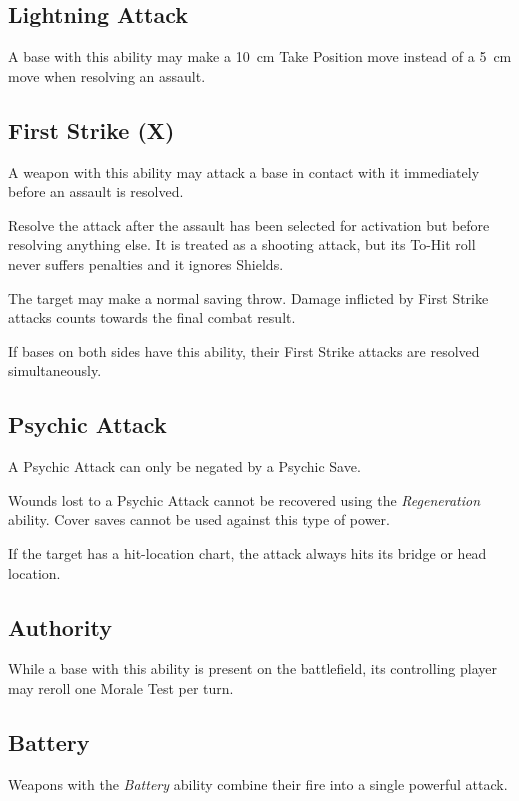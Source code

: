 \subsection{Lightning Attack}

A base with this ability may make a 10~cm Take Position move instead of a 5~cm move when resolving an assault.

\subsection{First Strike (X)}

A weapon with this ability may attack a base in contact with it immediately before an assault is resolved.

Resolve the attack after the assault has been selected for activation but before resolving anything else. It is treated as a shooting attack, but its To-Hit roll never suffers penalties and it ignores Shields.

The target may make a normal saving throw. Damage inflicted by First Strike attacks counts towards the final combat result.

If bases on both sides have this ability, their First Strike attacks are resolved simultaneously.

\subsection{Psychic Attack}

A Psychic Attack can only be negated by a Psychic Save.

Wounds lost to a Psychic Attack cannot be recovered using the \textit{Regeneration} ability. Cover saves cannot be used against this type of power.

If the target has a hit-location chart, the attack always hits its bridge or head location.

\subsection{Authority}

While a base with this ability is present on the battlefield, its controlling player may reroll one Morale Test per turn.

\subsection{Battery}

Weapons with the \textit{Battery} ability combine their fire into a single powerful attack.

